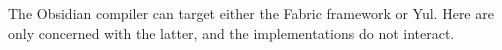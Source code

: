 The Obsidian compiler can target either the Fabric framework or Yul. Here
are only concerned with the latter, and the implementations do not
interact.
